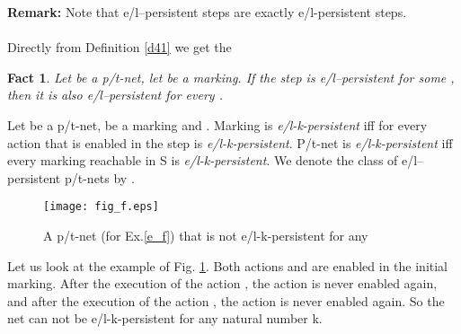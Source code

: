 \documentclass[a4paper]{llncs}
\newtheorem{fact}{Fact}
\begin{document}
\textbf{Remark:} Note that e/l--persistent steps are exactly e/l-persistent steps.
\\ \\
Directly from Definition \ref{d41} we get the
\begin{fact}
\label{f42}
Let  be a p/t-net, let  be a marking. If the step  is e/l--persistent for some , then it is also e/l--persistent for every .
\end{fact}

\begin{definition}
\label{d43}
Let  be a p/t-net,  be a marking and .
Marking  is \emph{e/l-k-persistent} iff for every action  that is enabled in  the step  is \emph{e/l-k-persistent}.
P/t-net  is \emph{e/l-k-persistent} iff every marking reachable in S is \emph{e/l-k-persistent}.
We denote the class of e/l--persistent p/t-nets by .
\end{definition}

\begin{example}
\label{e_f}
\begin{figure}[h]
\centering
\texttt{[image: fig\_f.eps]}
\caption{A p/t-net (for Ex.\ref{e_f}) that is not e/l-k-persistent for any }
\label{Fig_F}
\end{figure}

Let us look at the example of Fig. \ref{Fig_F}. Both actions  and  are enabled in the initial marking. After the execution of the action , the action  is never enabled again, and after the execution of the action , the action  is never enabled again. So the net can not be e/l-k-persistent for any natural number k.
\end{example}
\end{document}
